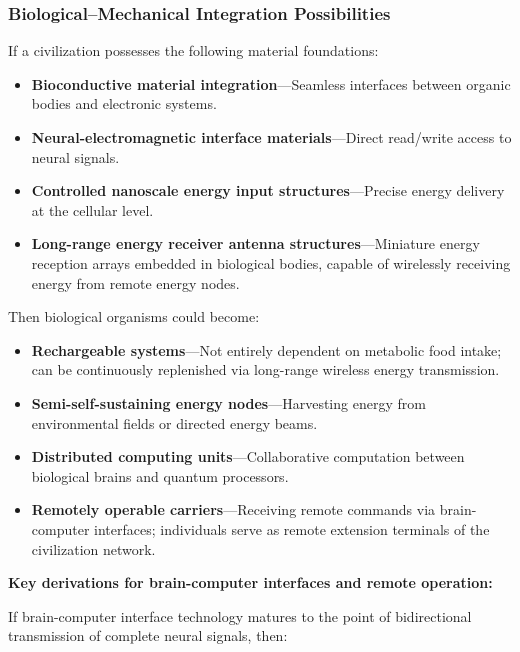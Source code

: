 \documentclass[aps,prd,twocolumn,superscriptaddress,nofootinbib]{revtex4-2}
\begin{document}
\subsubsection{Biological--Mechanical Integration Possibilities}\label{sec:bio-mech}

If a civilization possesses the following material foundations:

\begin{itemize}
  \item \textbf{Bioconductive material integration}---Seamless interfaces between organic bodies and electronic systems.
  \item \textbf{Neural-electromagnetic interface materials}---Direct read/write access to neural signals.
  \item \textbf{Controlled nanoscale energy input structures}---Precise energy delivery at the cellular level.
  \item \textbf{Long-range energy receiver antenna structures}---Miniature energy reception arrays embedded in biological bodies, capable of wirelessly receiving energy from remote energy nodes.
\end{itemize}

Then biological organisms could become:

\begin{itemize}
  \item \textbf{Rechargeable systems}---Not entirely dependent on metabolic food intake; can be continuously replenished via long-range wireless energy transmission.
  \item \textbf{Semi-self-sustaining energy nodes}---Harvesting energy from environmental fields or directed energy beams.
  \item \textbf{Distributed computing units}---Collaborative computation between biological brains and quantum processors.
  \item \textbf{Remotely operable carriers}---Receiving remote commands via brain-computer interfaces; individuals serve as remote extension terminals of the civilization network.
\end{itemize}

\textbf{Key derivations for brain-computer interfaces and remote operation:}

If brain-computer interface technology matures to the point of bidirectional transmission of complete neural signals, then:
\end{document}
